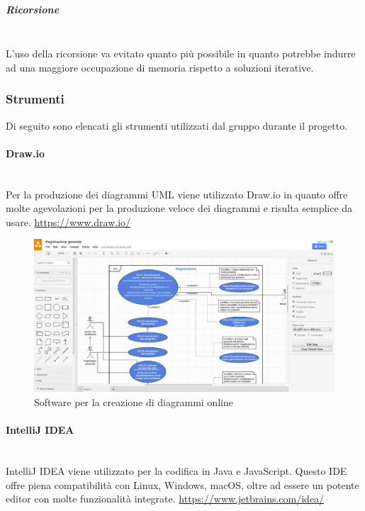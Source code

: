 			\subparagraph{Ricorsione} \mbox{}\\
			L'uso della ricorsione va evitato quanto più possibile in  quanto  potrebbe
			indurre  ad  una  maggiore  occupazione  di  memoria  rispetto  a  soluzioni
			iterative.
	\subsubsection{Strumenti}
	Di seguito sono elencati gli strumenti utilizzati dal gruppo durante il progetto.
		\paragraph{Draw.io} \mbox{}\\
		Per la produzione dei diagrammi UML viene utilizzato Draw.io in quanto offre molte agevolazioni per la produzione veloce dei diagrammi e risulta semplice da usare.
		\url{https://www.draw.io/}
		\begin{figure}[H]
			\includegraphics[width=0.99\linewidth]{res/images/drawio.jpg}
			\caption{Software per la creazione di diagrammi online}
		\end{figure} 
		\paragraph{IntelliJ IDEA} \mbox{}\\
		IntelliJ IDEA viene utilizzato per la codifica in Java e JavaScript. Questo IDE offre piena compatibilità con Linux, Windows, macOS, oltre ad essere un potente editor con molte funzionalità integrate.
		\url{https://www.jetbrains.com/idea/}

